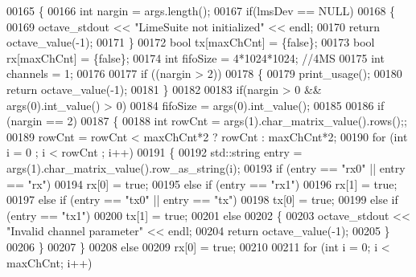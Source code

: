 \begin{DoxyCode}
00165 \{
00166     \textcolor{keywordtype}{int} nargin = args.length();
00167     \textcolor{keywordflow}{if}(lmsDev == NULL)
00168     \{
00169         octave\_stdout << \textcolor{stringliteral}{"LimeSuite not initialized"} << endl;
00170         \textcolor{keywordflow}{return} octave\_value(-1);
00171     \}
00172     \textcolor{keywordtype}{bool} tx[maxChCnt] = \{\textcolor{keyword}{false}\};
00173     \textcolor{keywordtype}{bool} rx[maxChCnt] = \{\textcolor{keyword}{false}\};
00174     \textcolor{keywordtype}{int} fifoSize = 4*1024*1024; \textcolor{comment}{//4MS}
00175     \textcolor{keywordtype}{int} channels = 1;
00176 
00177     \textcolor{keywordflow}{if} ((nargin > 2))
00178     \{
00179         print\_usage();
00180         \textcolor{keywordflow}{return} octave\_value(-1);
00181     \}
00182 
00183     \textcolor{keywordflow}{if}(nargin > 0 && args(0).int\_value() > 0)
00184         fifoSize = args(0).int\_value();
00185 
00186     \textcolor{keywordflow}{if} (nargin == 2)
00187     \{
00188         \textcolor{keywordtype}{int} rowCnt = args(1).char\_matrix\_value().rows();;
00189         rowCnt = rowCnt < maxChCnt*2 ? rowCnt : maxChCnt*2;
00190         \textcolor{keywordflow}{for} (\textcolor{keywordtype}{int} i = 0 ; i < rowCnt ; i++)
00191         \{
00192             std::string entry = args(1).char\_matrix\_value().row\_as\_string(i);
00193             \textcolor{keywordflow}{if} (entry == \textcolor{stringliteral}{"rx0"} || entry == \textcolor{stringliteral}{"rx"})
00194                 rx[0] = \textcolor{keyword}{true};
00195             \textcolor{keywordflow}{else} \textcolor{keywordflow}{if} (entry == \textcolor{stringliteral}{"rx1"})
00196                 rx[1] = \textcolor{keyword}{true};
00197             \textcolor{keywordflow}{else} \textcolor{keywordflow}{if} (entry == \textcolor{stringliteral}{"tx0"} || entry == \textcolor{stringliteral}{"tx"})
00198                 tx[0] = \textcolor{keyword}{true};
00199             \textcolor{keywordflow}{else} \textcolor{keywordflow}{if} (entry == \textcolor{stringliteral}{"tx1"})
00200                 tx[1] = \textcolor{keyword}{true};
00201             \textcolor{keywordflow}{else}
00202             \{
00203                 octave\_stdout << \textcolor{stringliteral}{"Invalid channel parameter"} << endl;
00204                 \textcolor{keywordflow}{return} octave\_value(-1);
00205             \}
00206         \}
00207     \}
00208     \textcolor{keywordflow}{else}
00209         rx[0] = \textcolor{keyword}{true};
00210 
00211     \textcolor{keywordflow}{for} (\textcolor{keywordtype}{int} i = 0; i < maxChCnt; i++)

\end{DoxyCode}
